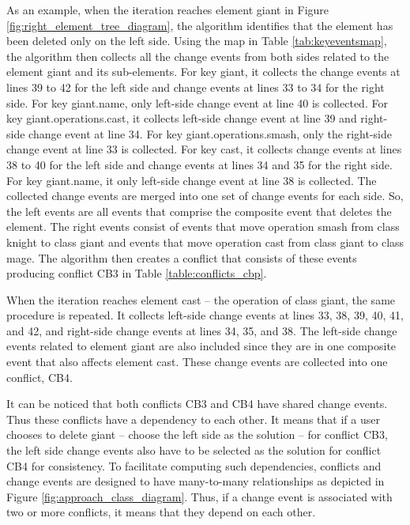 As an example, when the iteration reaches element \textsf{giant} in Figure \ref{fig:right_element_tree_diagram}, the algorithm identifies that the element has been deleted only on the left side.
Using the map in Table \ref{tab:keyeventsmap}, the algorithm then collects all the change events from both sides related to the element \textsf{giant} and its sub-elements. For key \textsf{giant}, it collects the change events at lines 39 to 42 for the left side and change events at lines 33 to 34 for the right side. For key \textsf{giant.name}, only left-side change event at line 40 is collected.
For key \textsf{giant.operations.cast}, it collects left-side change event at line 39 and right-side change event at line 34.
For key \textsf{giant.operations.smash}, only the right-side change event at line 33 is collected. 
For key \textsf{cast}, it collects change events at lines 38 to 40 for the left side and change events at lines 34 and 35 for the right side.
For key \textsf{giant.name}, it only left-side change event at line 38 is collected.
The collected change events are merged into one set of change events for each side. 
So, the left events are all events that comprise the composite event that deletes the element. 
The right events consist of events that move operation \textsf{smash} from class \textsf{knight} to class \textsf{giant} and events that
move operation \textsf{cast} from class \textsf{giant} to class \textsf{mage}. The algorithm then creates a conflict that consists of these events 
producing conflict \textsf{CB3} in Table \ref{table:conflicts_cbp}. 

When the iteration reaches element \textsf{cast} -- the operation of class \textsf{giant}, the same procedure is repeated. It collects left-side change events at lines 33, 38, 39, 40, 41, and 42, and right-side change events at lines 34, 35, and 38. The left-side change events related to element \textsf{giant} are also included since they are in one composite event that also affects element \textsf{cast}. These change events are collected into one conflict, \textsf{CB4}. 

It can be noticed that both conflicts \textsf{CB3} and \textsf{CB4} have shared change events. Thus these conflicts have a dependency to each other. It means that if a user chooses to delete \textsf{giant} -- choose the left side as the solution -- for conflict \textsf{CB3}, the left side change events also have to be selected as the solution for conflict \textsf{CB4} for consistency. To facilitate computing such dependencies, conflicts and change events are designed to have many-to-many relationships as depicted in Figure \ref{fig:approach_class_diagram}. Thus, if a change event is associated with two or more conflicts, it means that they depend on each other.

